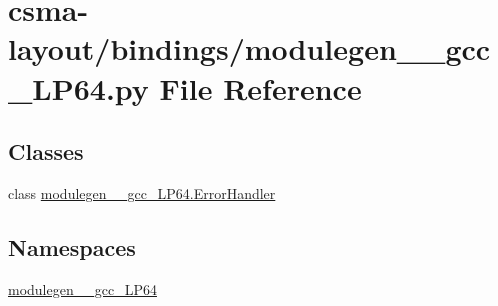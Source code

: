 \hypertarget{csma-layout_2bindings_2modulegen____gcc__LP64_8py}{}\section{csma-\/layout/bindings/modulegen\+\_\+\+\_\+gcc\+\_\+\+L\+P64.py File Reference}
\label{csma-layout_2bindings_2modulegen____gcc__LP64_8py}
\subsection*{Classes}
\begin{DoxyCompactItemize}
\item 
class \hyperlink{classmodulegen____gcc__LP64_1_1ErrorHandler}{modulegen\+\_\+\+\_\+gcc\+\_\+\+L\+P64.\+Error\+Handler}
\end{DoxyCompactItemize}
\subsection*{Namespaces}
\begin{DoxyCompactItemize}
\item 
 \hyperlink{namespacemodulegen____gcc__LP64}{modulegen\+\_\+\+\_\+gcc\+\_\+\+L\+P64}
\end{DoxyCompactItemize}
